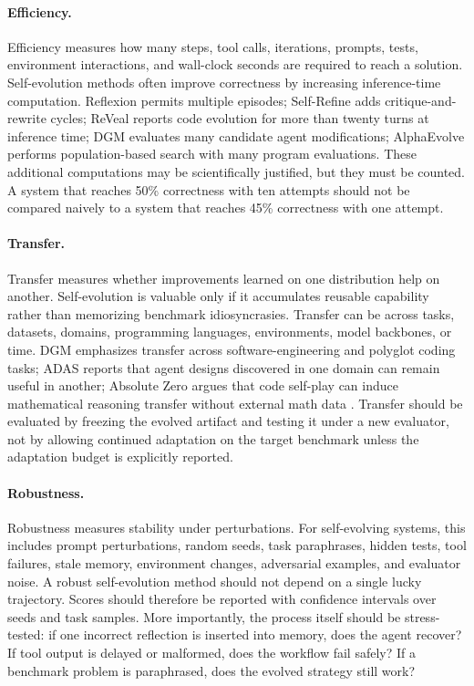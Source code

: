 \paragraph{Efficiency.}
Efficiency measures how many steps, tool calls, iterations, prompts, tests, environment interactions, and wall-clock seconds are required to reach a solution. Self-evolution methods often improve correctness by increasing inference-time computation. Reflexion permits multiple episodes; Self-Refine adds critique-and-rewrite cycles; ReVeal reports code evolution for more than twenty turns at inference time; DGM evaluates many candidate agent modifications; AlphaEvolve performs population-based search with many program evaluations. These additional computations may be scientifically justified, but they must be counted. A system that reaches 50\% correctness with ten attempts should not be compared naively to a system that reaches 45\% correctness with one attempt.

\paragraph{Transfer.}
Transfer measures whether improvements learned on one distribution help on another. Self-evolution is valuable only if it accumulates reusable capability rather than memorizing benchmark idiosyncrasies. Transfer can be across tasks, datasets, domains, programming languages, environments, model backbones, or time. DGM emphasizes transfer across software-engineering and polyglot coding tasks; ADAS reports that agent designs discovered in one domain can remain useful in another; Absolute Zero argues that code self-play can induce mathematical reasoning transfer without external math data \cite{adas2025,absolutezero2025}. Transfer should be evaluated by freezing the evolved artifact and testing it under a new evaluator, not by allowing continued adaptation on the target benchmark unless the adaptation budget is explicitly reported.

\paragraph{Robustness.}
Robustness measures stability under perturbations. For self-evolving systems, this includes prompt perturbations, random seeds, task paraphrases, hidden tests, tool failures, stale memory, environment changes, adversarial examples, and evaluator noise. A robust self-evolution method should not depend on a single lucky trajectory. Scores should therefore be reported with confidence intervals over seeds and task samples. More importantly, the process itself should be stress-tested: if one incorrect reflection is inserted into memory, does the agent recover? If tool output is delayed or malformed, does the workflow fail safely? If a benchmark problem is paraphrased, does the evolved strategy still work?

